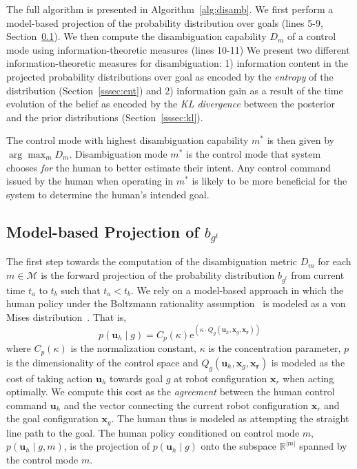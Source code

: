 \documentclass[letterpaper, 10 pt, conference]{ieeeconf}  %
\newcommand{\argmax}{\arg\!\max}
\begin{document}
The full algorithm is presented in Algorithm~\ref{alg:disamb}. We first perform a model-based projection of the probability distribution over goals (lines 5-9, Section~\ref{ssec:model_based}). We then compute the disambiguation capability $D_m$ of a control mode using information-theoretic measures (lines 10-11) We present two different information-theoretic measures for disambiguation: 1) information content in the projected probability distributions over goal as encoded by the \textit{entropy} of the distribution (Section~\ref{sssec:ent}) and 2) information gain as a result of the time evolution of the belief as encoded by the \textit{KL divergence} between the posterior and the prior distributions (Section~\ref{sssec:kl}). 

The control mode with highest disambiguation capability $m^*$ is then given by $\argmax_m D_m$. Disambiguation mode $m^*$ is the control mode that system chooses \textit{for} the human to better estimate their intent. Any control command issued by the human when operating in $m^*$ is likely to be more beneficial for the system to determine the human's intended goal. 
\subsection{Model-based Projection of $b_{g^t}$}\label{ssec:model_based}
The first step towards the computation of the disambiguation metric $D_m$ for each $m \in \mathcal{M}$ is the forward projection of the probability distribution $b_{g^t}$ from current time $t_a$ to $t_b$ such that $t_a < t_b$. We rely on a model-based approach in which the human policy under the Boltzmann rationality assumption~\cite{hula2015monte} is modeled as a von Mises distribution~\cite{mardia1975statistics}. That is,
\begin{equation}
	p(\boldsymbol{u}_h \;| \;g ) = C_p(\kappa)\text{e}^{(\kappa\cdot Q_g(\boldsymbol{u}_h, \boldsymbol{x}_g, \boldsymbol{x_r}))}
\end{equation}
where $C_p(\kappa)$ is the normalization constant, $\kappa$ is the concentration parameter, $p$ is the dimensionality of the control space and $Q_g(\boldsymbol{u}_h, \boldsymbol{x}_g, \boldsymbol{x_r})$ is modeled as the cost of taking action $\boldsymbol{u}_h$ towards goal $g$ at robot configuration $\boldsymbol{x}_r$ when acting optimally. We compute this cost as the \textit{agreement} between the human control command $\boldsymbol{u}_h$ and the vector connecting the current robot configuration $\boldsymbol{x}_r$ and the goal configuration $\boldsymbol{x}_g$. The human thus is modeled as attempting the straight line path to the goal. The human policy conditioned on control mode $m$, $p(\boldsymbol{u}_h \;| \;g, m )$, is the projection of $p(\boldsymbol{u}_h \;| \;g )$ onto the subspace $\mathbb{R}^{|m|}$ spanned by the control mode $m$. 
\end{document}
